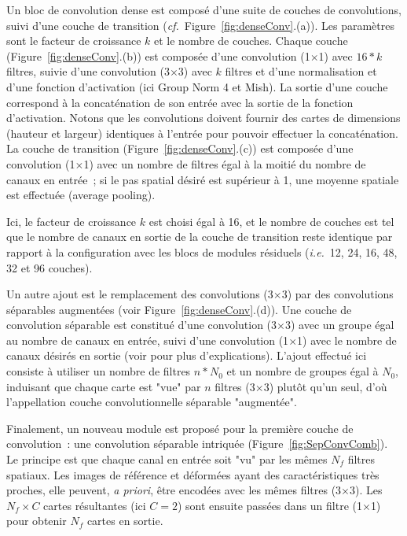 \documentclass[
	a4paper, %
	10pt, %
	twoside, %
	french
]{LTJournalArticle}
\newcommand\fref[1]{Figure~\ref{#1}}
\begin{document}
Un bloc de convolution dense est composé d'une suite de couches de convolutions, suivi d'une couche de transition (\textit{cf.}~\fref{fig:denseConv}.(a)).
Les paramètres sont le facteur de croissance $k$ et le nombre de couches.
Chaque couche (\fref{fig:denseConv}.(b)) est composée d'une convolution (1$\times$1) avec $16*k$ filtres, suivie d'une convolution (3$\times$3) avec $k$ filtres et d'une normalisation et d'une fonction d'activation (ici Group Norm 4 et Mish).
La sortie d'une couche correspond à la concaténation de son entrée avec la sortie de la fonction d'activation.
Notons que les convolutions doivent fournir des cartes de dimensions (hauteur et largeur) identiques à l'entrée pour pouvoir effectuer la concaténation.
La couche de transition (\fref{fig:denseConv}.(c)) est composée d'une convolution (1$\times$1) avec un nombre de filtres égal à la moitié du nombre de canaux en entrée~; si le pas spatial désiré est supérieur à 1, une moyenne spatiale est effectuée (average pooling).

Ici, le facteur de croissance $k$ est choisi égal à 16, et le nombre de couches est tel que le nombre de canaux en sortie de la couche de transition reste identique par rapport à la configuration avec les blocs de modules résiduels (\textit{i.e.}~12, 24, 16, 48, 32 et 96 couches).

Un autre ajout est le remplacement des convolutions (3$\times$3) par des convolutions séparables augmentées (voir \fref{fig:denseConv}.(d)).
Une couche de convolution séparable est constitué d'une convolution (3$\times$3) avec un groupe égal au nombre de canaux en entrée, suivi d'une convolution (1$\times$1) avec le nombre de canaux désirés en sortie (voir \cite{AGeron:2023} pour plus d'explications).
L'ajout effectué ici consiste à utiliser un nombre de filtres $n * N_0$ et un nombre de groupes égal à $N_0$, induisant que chaque carte est "vue" par $n$ filtres (3$\times$3) plutôt qu'un seul, d'où l'appellation couche convolutionnelle séparable "augmentée". 

Finalement, un nouveau module est proposé pour la première couche de convolution~: une convolution séparable intriquée (\fref{fig:SepConvComb}).
Le principe est que chaque canal en entrée soit "vu" par les mêmes $N_f$ filtres spatiaux.
Les images de référence et déformées ayant des caractéristiques très proches, elle peuvent, \textit{a priori}, être encodées avec les mêmes filtres (3$\times$3).
Les $N_f \times C$ cartes résultantes (ici $C = 2$) sont ensuite passées dans un filtre (1$\times$1) pour obtenir $N_f$ cartes en sortie.
\end{document}
